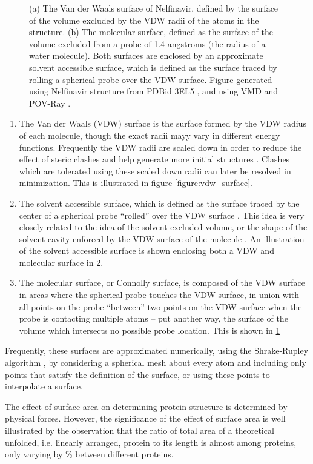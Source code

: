\begin{figure}[h]
\begin{subfigure}[b]{0.4\textwidth}
\caption{}
\label{figure:molecular_surface}
\end{subfigure}
\caption{(a) The Van der Waals surface of Nelfinavir, defined by the surface of the volume excluded by the VDW radii of the atoms in the structure.
(b) The molecular surface, defined as the surface of the volume excluded from a probe of 1.4 angstroms (the radius of a water molecule).
Both surfaces are enclosed by an approximate solvent accessible surface, which is defined as the surface traced by rolling a spherical probe over the VDW surface.
Figure generated using Nelfinavir structure from PDBid 3EL5 \protect\cite{king2012extreme}, and using VMD and POV-Ray \protect\cite{humphrey1996vmd,povray}.}
\label{figure:surfaces}
\end{figure}
\begin{enumerate}
\item The Van der Waals (VDW) surface is the surface formed by the VDW radius of each molecule, though the exact radii mayy vary in different energy functions.
Frequently the VDW radii are scaled down in order to reduce the effect of steric clashes and help generate more initial structures \cite{schulz2003binding,halgren2004glide}.
Clashes which are tolerated using these scaled down radii can later be resolved in minimization.
This is illustrated in figure \ref{figure:vdw_surface}.
\item The solvent accessible surface, which is defined as the surface traced by the center of a spherical probe ``rolled'' over the VDW surface \cite{richards1977areas}.
This idea is very closely related to the idea of the solvent excluded volume, or the shape of the solvent cavity enforced by the VDW surface of the molecule \cite{richmond1984solvent}.
An illustration of the solvent accessible surface is shown enclosing both a VDW and molecular surface in \ref{figure:surfaces}.
\item The molecular surface, or Connolly surface, is composed of the VDW surface in areas where the spherical probe touches the VDW surface, in union with all points on the probe ``between'' two points on the VDW surface when the probe is contacting multiple atoms \cite{connolly1983analytical} -- put another way, the surface of the volume which intersects no possible probe location.
This is shown in \ref{figure:molecular_surface}
\end{enumerate}
Frequently, these surfaces are approximated numerically, using the Shrake-Rupley algorithm \cite{shrake1973environment}, by considering a spherical mesh about every atom and including only points that satisfy the definition of the surface, or using these points to interpolate a surface.

The effect of surface area on determining protein structure is determined by physical forces.
However, the significance of the effect of surface area is well illustrated by the observation that the ratio of total area of a theoretical unfolded, i.e. linearly arranged, protein to its length is almost among proteins, only varying by \% between different proteins.
